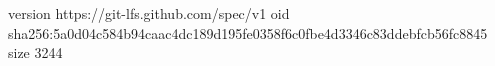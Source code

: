 version https://git-lfs.github.com/spec/v1
oid sha256:5a0d04c584b94caac4dc189d195fe0358f6c0fbe4d3346c83ddebfcb56fc8845
size 3244
